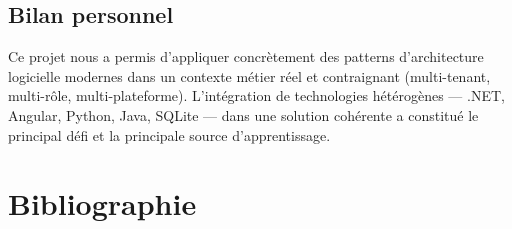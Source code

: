 \section*{Bilan personnel}

Ce projet nous a permis d'appliquer concrètement des patterns d'architecture
logicielle modernes dans un contexte métier réel et contraignant (multi-tenant,
multi-rôle, multi-plateforme). L'intégration de technologies hétérogènes ---
.NET, Angular, Python, Java, SQLite --- dans une solution cohérente a constitué
le principal défi et la principale source d'apprentissage.

\cleardoublepage

\chapter*{Bibliographie}
\thispagestyle{plain}

